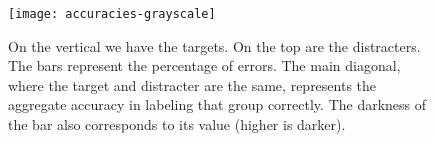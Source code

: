 \begin{figure}[!ht]
\centering
\texttt{[image: accuracies-grayscale]}
\caption{On the vertical we have the targets. On the top are the distracters. The bars represent the percentage of errors. The main diagonal, where the target and distracter are the same, represents the aggregate accuracy in labeling that group correctly. The darkness of the bar also corresponds to its value (higher is darker).}
\label{fullacc}
\end{figure}